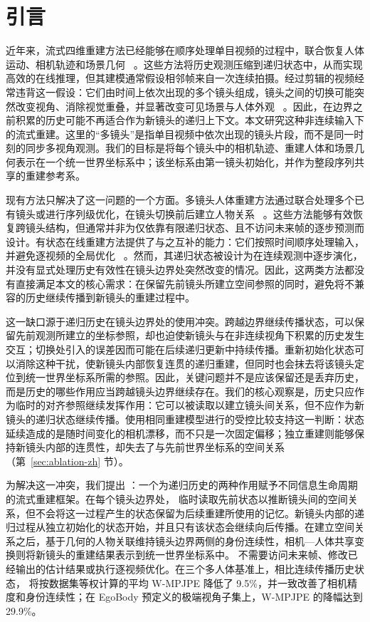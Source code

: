 \section{引言}

近年来，流式四维重建方法已经能够在顺序处理单目视频的过程中，联合恢复人体运动、相机轨迹和场景几何
~\citep{wang2025cut3r,chen2026human3r,sur2026unicon3r}。这些方法将历史观测压缩到递归状态中，从而实现高效的在线推理，但其建模通常假设相邻帧来自一次连续拍摄。经过剪辑的视频经常违背这一假设：它们由时间上依次出现的多个镜头组成，镜头之间的切换可能突然改变视角、消除视觉重叠，并显著改变可见场景与人体外观
~\citep{pavlakos2022multishot,zhang2025humanmm,on2026multithumbs}。因此，在边界之前积累的历史可能不再适合作为新镜头的递归上下文。本文研究这种非连续输入下的流式重建。这里的“多镜头”是指单目视频中依次出现的镜头片段，而不是同一时刻的同步多视角观测。我们的目标是将每个镜头中的相机轨迹、重建人体和场景几何表示在一个统一世界坐标系中；该坐标系由第一镜头初始化，并作为整段序列共享的重建参考系。

现有方法只解决了这一问题的一个方面。多镜头人体重建方法通过联合处理多个已有镜头或进行序列级优化，在镜头切换前后建立人物关系
~\citep{pavlakos2022multishot,zhang2025humanmm,on2026multithumbs}。这些方法能够有效恢复跨镜头结构，但通常并非为仅依靠有限递归状态、且不访问未来帧的逐步预测而设计。有状态在线重建方法提供了与之互补的能力：它们按照时间顺序处理输入，并避免逐视频的全局优化
~\citep{wang2025cut3r,chen2026human3r,chen2025long3r}。然而，其递归状态被设计为在连续观测中逐步演化，并没有显式处理历史有效性在镜头边界处突然改变的情况。因此，这两类方法都没有直接满足本文的核心需求：在保留先前镜头所建立空间参照的同时，避免将不兼容的历史继续传播到新镜头的重建过程中。

这一缺口源于递归历史在镜头边界处的使用冲突。跨越边界继续传播状态，可以保留先前观测所建立的坐标参照，却也迫使新镜头与在非连续视角下积累的历史发生交互；切换处引入的误差因而可能在后续递归更新中持续传播。重新初始化状态可以消除这种干扰，使新镜头内部恢复连贯的递归重建，但同时也会抹去将该镜头定位到统一世界坐标系所需的参照。因此，关键问题并不是应该保留还是丢弃历史，而是历史的哪些作用应当跨越镜头边界继续存在。我们的核心观察是，历史只应作为临时的对齐参照继续发挥作用：它可以被读取以建立镜头间关系，但不应作为新镜头的递归状态继续传播。使用相同重建模型进行的受控比较支持这一判断：状态延续造成的是随时间变化的相机漂移，而不只是一次固定偏移；独立重建则能够保持新镜头内部的连贯性，却失去了与先前世界坐标系的空间关系（第~\ref{sec:ablation-zh} 节）。

为解决这一冲突，我们提出 \method{}：一个为递归历史的两种作用赋予不同信息生命周期的流式重建框架。在每个镜头边界处，\method{} 临时读取先前状态以推断镜头间的空间关系，但不会将这一过程产生的状态保留为后续重建所使用的记忆。新镜头内部的递归过程从独立初始化的状态开始，并且只有该状态会继续向后传播。在建立空间关系之后，基于几何的人物关联维持镜头边界两侧的身份连续性，相机—人体共享变换则将新镜头的重建结果表示到统一世界坐标系中。\method{} 不需要访问未来帧、修改已经输出的估计结果或执行逐视频优化。在三个多人体基准上，相比连续传播历史状态，\method{} 将按数据集等权计算的平均 W-MPJPE 降低了 9.5\%，并一致改善了相机精度和身份连续性；在 EgoBody 预定义的极端视角子集上，W-MPJPE 的降幅达到 29.9\%。

